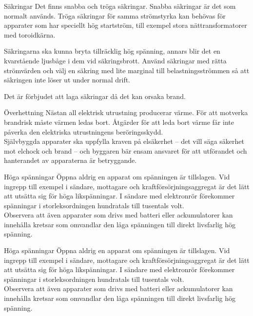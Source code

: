 \documentclass{beamer}
\begin{document}
\begin{frame}{Säkringar}
Det finns snabba och tröga säkringar.
Snabba säkringar är det som normalt används.
Tröga säkringar för samma strömstyrka kan behövas för apparater som har
speciellt hög startström, till exempel stora nättransformatorer med toroidkärna.

Säkringarna ska kunna bryta tillräcklig hög spänning, annars blir det
en kvarstående ljusbåge i dem vid säkringsbrott.
Använd säkringar med rätta strömvärden och välj en säkring med lite marginal
till belastningsströmmen så att säkringen inte löser ut under normal drift.

Det är förbjudet att laga säkringar då det kan orsaka brand.

\end{frame}
\begin{frame}{Överhettning}
Nästan all elektrisk utrustning producerar värme.
För att motverka brandrisk måste värmen ledas bort.
Åtgärder för att leda bort värme får inte påverka den elektriska utrustningens
beröringsskydd.\\
\vspace{5mm}
Självbyggda apparater ska uppfylla kraven på elsäkerhet -- det vill säga
säkerhet mot elchock och brand -- och byggaren bär ensam ansvaret för att
utförandet och hanterandet av apparaterna är betryggande.
\end{frame}

\begin{frame}{Höga spänningar}
Öppna aldrig en apparat om spänningen är tillslagen.
Vid ingrepp till exempel i sändare, mottagare och kraftförsörjningsaggregat är
det lätt att utsätta sig för höga likspänningar.
I sändare med elektronrör förekommer spänningar i storleksordningen hundratals
till tusentals volt.\\
\vspace{5mm}
Observera att även apparater som drivs med batteri eller ackumulatorer kan
innehålla kretsar som omvandlar den låga spänningen till direkt livsfarlig hög
spänning.
\end{frame}
\begin{frame}{Höga spänningar}
Öppna aldrig en apparat om spänningen är tillslagen.
Vid ingrepp till exempel i sändare, mottagare och kraftförsörjningsaggregat är
det lätt att utsätta sig för höga likspänningar.
I sändare med elektronrör förekommer spänningar i storleksordningen hundratals
till tusentals volt.\\
\vspace{5mm}
Observera att även apparater som drivs med batteri eller ackumulatorer kan
innehålla kretsar som omvandlar den låga spänningen till direkt livsfarlig hög
spänning.
\end{frame}
\end{document}
